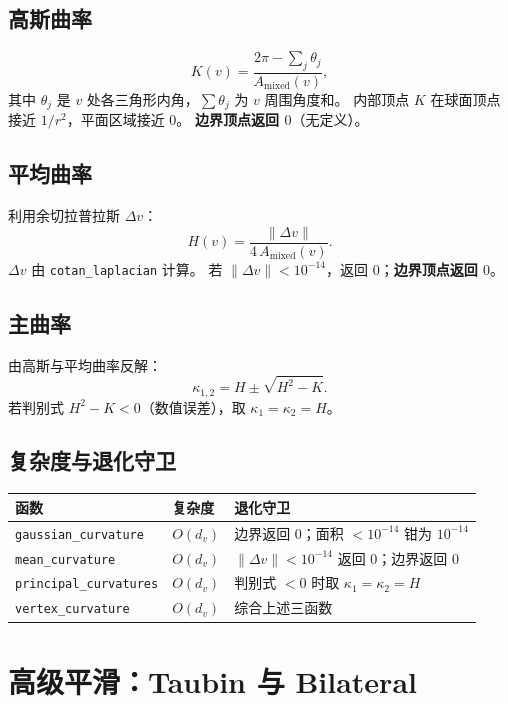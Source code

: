 \documentclass[11pt,a4paper]{article}
\begin{document}
\subsection{高斯曲率}

\[
  K(v) = \frac{2\pi - \sum_{j} \theta_j}{A_{\text{mixed}}(v)},
\]
其中 $\theta_j$ 是 $v$ 处各三角形内角，$\sum \theta_j$ 为 $v$ 周围角度和。
内部顶点 $K$ 在球面顶点接近 $1/r^2$，平面区域接近 $0$。
\textbf{边界顶点返回 $0$}（无定义）。

\subsection{平均曲率}

利用余切拉普拉斯 $\Delta v$：
\[
  H(v) = \frac{\|\Delta v\|}{4 \, A_{\text{mixed}}(v)}.
\]
$\Delta v$ 由 \texttt{cotan\_laplacian} 计算。
若 $\|\Delta v\| < 10^{-14}$，返回 $0$；\textbf{边界顶点返回 $0$}。

\subsection{主曲率}

由高斯与平均曲率反解：
\[
  \kappa_{1, 2} = H \pm \sqrt{H^2 - K}.
\]
若判别式 $H^2 - K < 0$（数值误差），取 $\kappa_1 = \kappa_2 = H$。

\subsection{复杂度与退化守卫}

\begin{center}
\renewcommand{\arraystretch}{1.18}
\begin{tabular}{@{}lll@{}}
  \toprule
  \textbf{函数} & \textbf{复杂度} & \textbf{退化守卫} \\
  \midrule
  \texttt{gaussian\_curvature}  & $O(d_v)$ & 边界返回 0；面积 $< 10^{-14}$ 钳为 $10^{-14}$ \\
  \texttt{mean\_curvature}      & $O(d_v)$ & $\|\Delta v\| < 10^{-14}$ 返回 0；边界返回 0 \\
  \texttt{principal\_curvatures}& $O(d_v)$ & 判别式 $< 0$ 时取 $\kappa_1 = \kappa_2 = H$ \\
  \texttt{vertex\_curvature}    & $O(d_v)$ & 综合上述三函数 \\
  \bottomrule
\end{tabular}
\end{center}

\section{高级平滑：Taubin 与 Bilateral}
\end{document}
